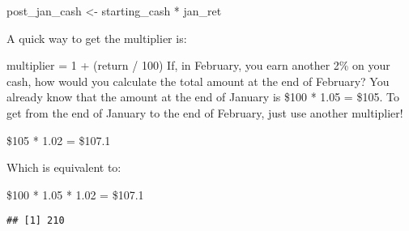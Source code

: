 \documentclass[]{article}
\newenvironment{Shaded}{\begin{snugshade}}{\end{snugshade}}
\newcommand{\DecValTok}[1]{\textcolor[rgb]{0.00,0.00,0.81}{#1}}
\newcommand{\StringTok}[1]{\textcolor[rgb]{0.31,0.60,0.02}{#1}}
\newcommand{\CommentTok}[1]{\textcolor[rgb]{0.56,0.35,0.01}{\textit{#1}}}
\newcommand{\OperatorTok}[1]{\textcolor[rgb]{0.81,0.36,0.00}{\textbf{#1}}}
\newcommand{\NormalTok}[1]{#1}
\begin{document}
post\_jan\_cash \textless{}- starting\_cash * jan\_ret

A quick way to get the multiplier is:

multiplier = 1 + (return / 100) If, in February, you earn another 2\% on
your cash, how would you calculate the total amount at the end of
February? You already know that the amount at the end of January is
\$100 * 1.05 = \$105. To get from the end of January to the end of
February, just use another multiplier!

\$105 * 1.02 = \$107.1

Which is equivalent to:

\$100 * 1.05 * 1.02 = \$107.1

\begin{Shaded}
\end{Shaded}

\begin{verbatim}
## [1] 210
\end{verbatim}

\begin{Shaded}
\end{Shaded}
\end{document}
